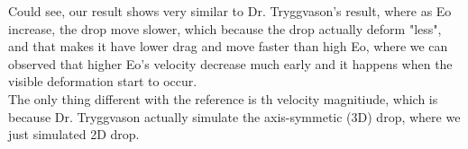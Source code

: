 \documentclass[12pt]{article}
\begin{document}
Could see, our result shows very similar to Dr. Tryggvason's result, where as Eo increase, the drop move slower, which because the drop actually deform "less", and that makes it have lower drag and move faster than high Eo, where we can observed that higher Eo's velocity decrease much early and it happens when the visible deformation start to occur. \\

The only thing different with the reference is th velocity magnitiude, which is because Dr. Tryggvason actually simulate the axis-symmetic (3D) drop, where we just simulated 2D drop. 







\end{document}
